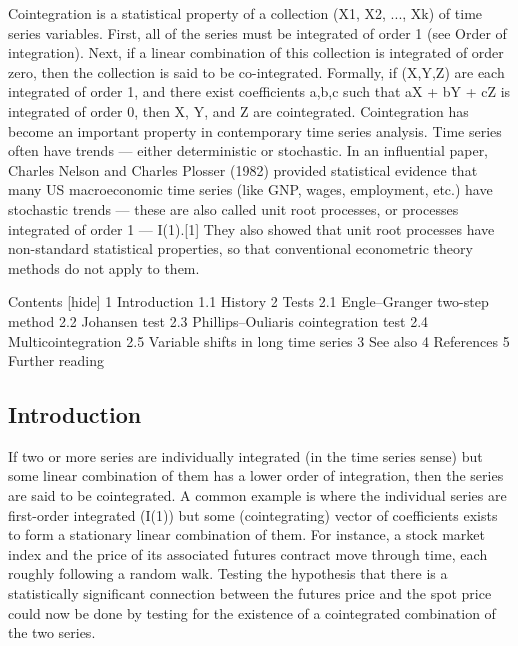 Cointegration is a statistical property of a collection (X1, X2, ..., Xk) of time series variables. First, all of the series must be integrated of order 1 (see Order of integration). Next, if a linear combination of this collection is integrated of order zero, then the collection is said to be co-integrated. Formally, if (X,Y,Z) are each integrated of order 1, and there exist coefficients a,b,c such that aX + bY + cZ is integrated of order 0, then X, Y, and Z are cointegrated. Cointegration has become an important property in contemporary time series analysis. Time series often have trends — either deterministic or stochastic. In an influential paper, Charles Nelson and Charles Plosser (1982) provided statistical evidence that many US macroeconomic time series (like GNP, wages, employment, etc.) have stochastic trends — these are also called unit root processes, or processes integrated of order 1 — I(1).[1] They also showed that unit root processes have non-standard statistical properties, so that conventional econometric theory methods do not apply to them.

Contents  [hide] 
1	Introduction
1.1	History
2	Tests
2.1	Engle–Granger two-step method
2.2	Johansen test
2.3	Phillips–Ouliaris cointegration test
2.4	Multicointegration
2.5	Variable shifts in long time series
3	See also
4	References
5	Further reading
\subsection*{Introduction}
If two or more series are individually integrated (in the time series sense) but some linear combination of them has a lower order of integration, then the series are said to be cointegrated. A common example is where the individual series are first-order integrated (I(1)) but some (cointegrating) vector of coefficients exists to form a stationary linear combination of them. For instance, a stock market index and the price of its associated futures contract move through time, each roughly following a random walk. Testing the hypothesis that there is a statistically significant connection between the futures price and the spot price could now be done by testing for the existence of a cointegrated combination of the two series.


